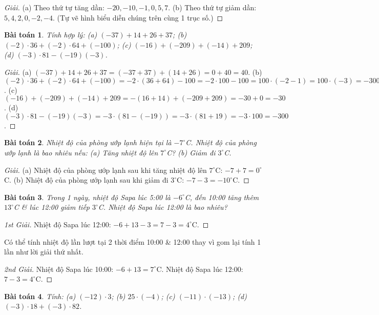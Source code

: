 \documentclass{article}
\numberwithin{equation}{section}
\newtheorem{baitoan}{Bài toán}[section]
\begin{document}
\begin{proof}[Giải]
	(a) Theo thứ tự tăng dần: $-20,-10,-1,0,5,7$. (b) Theo thứ tự giảm dần: $5,4,2,0,-2,-4$. (Tự vẽ hình biểu diễn chúng trên cùng 1 trục số.)
\end{proof}

\begin{baitoan}
	Tính hợp lý: (a) $(-37) + 14 + 26 + 37$; (b) $(-2)\cdot36 + (-2)\cdot64 + (-100)$; (c) $(-16) + (-209) + (-14) + 209$; (d) $(-3)\cdot81 - (-19)(-3)$.
\end{baitoan}

\begin{proof}[Giải]
	(a) $(-37) + 14 + 26 + 37 = (-37 + 37) + (14 + 26) = 0 + 40 = 40$. (b) $(-2)\cdot36 + (-2)\cdot64 + (-100) = -2\cdot(36 + 64) - 100 = -2\cdot100 - 100 = 100\cdot(-2 - 1) = 100\cdot(-3) = -300$. (c) $(-16) + (-209) + (-14) + 209 = -(16 + 14) + (-209 + 209) = -30 + 0 = -30$. (d) $(-3)\cdot81 - (-19)(-3) = -3\cdot(81 -(-19)) = -3\cdot(81 + 19) = -3\cdot100 = -300$.
\end{proof}

\begin{baitoan}
	Nhiệt độ của phòng ướp lạnh hiện tại là $-7^\circ$C. Nhiệt độ của phòng ướp lạnh là bao nhiêu nếu: (a) Tăng nhiệt độ lên $7^\circ$C? (b) Giảm đi $3^\circ$C.
\end{baitoan}

\begin{proof}[Giải]
	(a) Nhiệt độ của phòng ướp lạnh sau khi tăng nhiệt độ lên $7^\circ$C: $-7 + 7 = 0^\circ$C. (b) Nhiệt độ của phòng ướp lạnh sau khi giảm đi $3^\circ$C: $-7 - 3 = -10^\circ$C.
\end{proof}

\begin{baitoan}
	Trong 1 ngày, nhiệt độ Sapa lúc 5:00 là $-6^\circ$C, đến 10:00 tăng thêm $13^\circ$C \& lúc 12:00 giảm tiếp $3^\circ$C. Nhiệt độ Sapa lúc 12:00 là bao nhiêu?
\end{baitoan}

\begin{proof}[1st Giải]
	Nhiệt độ Sapa lúc 12:00: $-6 + 13 - 3 = 7 - 3 = 4^\circ$C.
\end{proof}
Có thể tính nhiệt độ lần lượt tại 2 thời điểm 10:00 \& 12:00 thay vì gom lại tính 1 lần như lời giải thứ nhất.
\begin{proof}[2nd Giải]
	Nhiệt độ Sapa lúc 10:00: $-6 + 13 = 7^\circ$C. Nhiệt độ Sapa lúc 12:00: $7 - 3 = 4^\circ$C.
\end{proof}

\begin{baitoan}
	Tính: (a) $(-12)\cdot3$; (b) $25\cdot(-4)$; (c) $(-11)\cdot(-13)$; (d) $(-3)\cdot18 + (-3)\cdot82$.
\end{baitoan}
\end{document}
